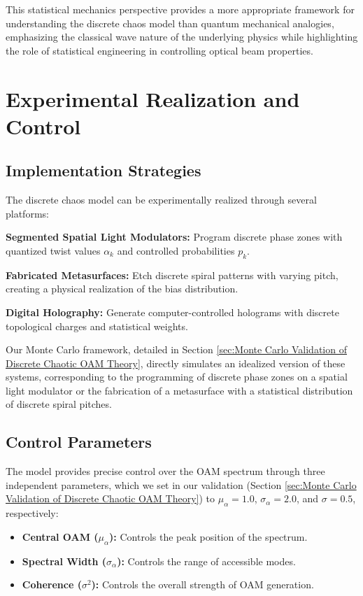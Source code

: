 \documentclass[a4paper,12pt]{article}
\begin{document}
This statistical mechanics perspective provides a more appropriate framework for understanding the discrete chaos model than quantum mechanical analogies, emphasizing the classical wave nature of the underlying physics while highlighting the role of statistical engineering in controlling optical beam properties.


\section{Experimental Realization and Control}

\subsection{Implementation Strategies}
The discrete chaos model can be experimentally realized through several platforms:

\textbf{Segmented Spatial Light Modulators:} Program discrete phase zones with quantized twist values $\alpha_k$ 
and controlled probabilities $p_k$.

\textbf{Fabricated Metasurfaces:} Etch discrete spiral patterns with varying pitch, creating a physical 
realization of the bias distribution.

\textbf{Digital Holography:} Generate computer-controlled holograms with discrete topological charges and 
statistical weights.

Our Monte Carlo framework, detailed in Section \ref{sec:Monte Carlo Validation of Discrete Chaotic OAM Theory}, directly simulates an idealized version of these systems, 
corresponding to the programming of discrete phase zones on a spatial light modulator or the fabrication of a 
metasurface with a statistical distribution of discrete spiral pitches.

\subsection{Control Parameters}
The model provides precise control over the OAM spectrum through three independent parameters, which 
we set in our validation (Section \ref{sec:Monte Carlo Validation of Discrete Chaotic OAM Theory}) to $\mu_\alpha = 1.0$, $\sigma_\alpha = 2.0$, and $\sigma = 0.5$, 
respectively:

\begin{itemize}
    \item \textbf{Central OAM ($\mu_\alpha$):} Controls the peak position of the spectrum.
    \item \textbf{Spectral Width ($\sigma_\alpha$):} Controls the range of accessible modes.
    \item \textbf{Coherence ($\sigma^2$):} Controls the overall strength of OAM generation.
\end{itemize}
\end{document}
